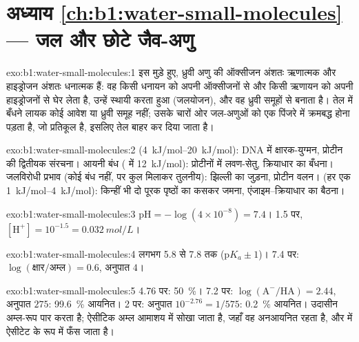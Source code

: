 \section*{अध्याय \ref{ch:b1:water-small-molecules} --- जल और छोटे जैव-अणु}

\begin{solution}{exo:b1:water-small-molecules:1}
इस मुड़े हुए, ध्रुवी अणु की ऑक्सीजन अंशतः ऋणात्मक और हाइड्रोजन अंशतः
धनात्मक हैं: वह किसी धनायन को अपनी ऑक्सीजनों से और किसी ऋणायन को अपनी
हाइड्रोजनों से घेर लेता है, उन्हें स्थायी करता हुआ (जलयोजन), और वह ध्रुवी
समूहों से  बनाता है। तेल में बँधने लायक कोई आवेश या ध्रुवी
समूह नहीं; उसके चारों ओर जल-अणुओं को एक पिंजरे में क्रमबद्ध होना पड़ता है,
जो प्रतिकूल है, इसलिए तेल बाहर कर दिया जाता है।
\end{solution}

\begin{solution}{exo:b1:water-small-molecules:2}
 (\qtyrange{4}{20}{kJ/mol}): DNA में क्षारक-युग्मन, प्रोटीन
की द्वितीयक संरचना। आयनी बंध ( में \qty{12}{kJ/mol}): प्रोटीनों में
लवण-सेतु, क्रियाधार का बँधना। जलविरोधी प्रभाव (कोई बंध नहीं,
पर कुल मिलाकर तुलनीय): झिल्ली का जुड़ना, प्रोटीन वलन।  (हर एक \qtyrange{1}{4}{kJ/mol}): किन्हीं भी दो
पूरक पृष्ठों का कसकर जमना, एंजाइम--क्रियाधार का बैठना।
\end{solution}

\begin{solution}{exo:b1:water-small-molecules:3}
$\mathrm{pH} = -\log(4\times 10^{-8}) = 7.4$।  1.5 पर,
$[\mathrm{H^+}] = 10^{-1.5} = \qty{0.032}{mol/L}$।
\end{solution}

\begin{solution}{exo:b1:water-small-molecules:4}
लगभग 5.8 से 7.8 तक (p$K_a \pm 1$)। 7.4 पर: $\log(\text{क्षार}/\text{अम्ल})
= 0.6$, अनुपात $4$।
\end{solution}

\begin{solution}{exo:b1:water-small-molecules:5}
 4.76 पर: \qty{50}{\%}। 7.2 पर: $\log(\mathrm{A^-}/\mathrm{HA}) =
2.44$, अनुपात $275$: \qty{99.6}{\%} आयनित।  2 पर: अनुपात $10^{-2.76} =
1/575$: \qty{0.2}{\%} आयनित। उदासीन अम्ल-रूप  पार करता है; ऐसीटिक अम्ल आमाशय में सोखा जाता है, जहाँ वह
अनआयनित रहता है, और  में ऐसीटेट के रूप में फँस जाता है।
\end{solution}

